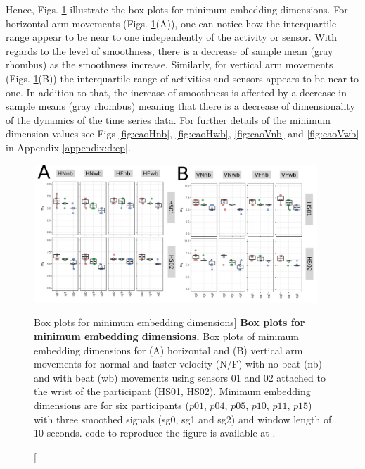 Hence, Figs. \ref{fig:CAO-hii} illustrate the box plots for minimum 
embedding dimensions.
For horizontal arm movements (Figs. \ref{fig:CAO-hii}(A)), 
one can notice how the interquartile range  
appear to be near to one independently of the 
activity or sensor. 
With regards to the level of smoothness,
there is a decrease of sample mean (gray rhombus) 
as the smoothness increase.  
Similarly, for vertical arm movements (Figs. \ref{fig:CAO-hii}(B))
the interquartile range of activities and sensors 
appears to be near to one. In addition to that, 
the increase of smoothness is affected by a decrease 
in sample means (gray rhombus) meaning that there is 
a decrease of dimensionality of the dynamics of 
the time series data.
For further details of the minimum dimension values see 
Figs \ref{fig:caoHnb}, \ref{fig:caoHwb}, \ref{fig:caoVnb} and 
\ref{fig:caoVwb} in Appendix \ref{appendix:d:ep}.
\begin{figure}
\centering
\includegraphics[width=0.95\textwidth]{fig_5_03}
	\caption
	[Box plots for minimum embedding dimensions]{
	{\bf Box plots for minimum embedding dimensions.} 
		Box plots of minimum embedding dimensions for 
		(A) horizontal and (B) vertical arm movements for
		normal  and faster velocity (N/F) with no beat (nb) 
		and with beat (wb) movements
		using sensors 01 and 02 attached to the wrist of the 
		participant (HS01, HS02).
		Minimum embedding dimensions are for six participants 
		($p01$, $p04$, $p05$, $p10$, $p11$, $p15$) with three 
		smoothed signals (sg0, sg1 and sg2)
		and window length of 10 seconds.
	\R code to reproduce the figure is available at 
	.
        }
    \label{fig:CAO-hii}
\end{figure}

